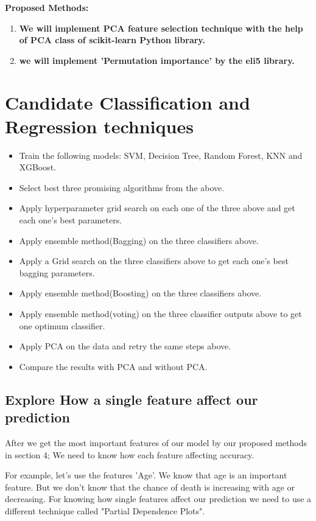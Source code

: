 \documentclass[5 pt]{article}
\begin{document}
\textbf{Proposed Methods:}\\
\begin{enumerate}

\item \textbf{We will implement PCA feature selection technique with the help of PCA class of scikit-learn Python library.}


\item \textbf{we will implement 'Permutation importance' by the eli5 library.}
\end{enumerate}



\newpage

\section{Candidate Classification and Regression techniques}

\begin{itemize}
\item Train the following models: SVM, Decision Tree, Random Forest, KNN and XGBoost.
\item Select best three promising algorithms from the above.
\item Apply hyperparameter grid search on each one of the three above and get each one's best parameters.
\item Apply ensemble method(Bagging) on the three classifiers above.
\item Apply a Grid search on the three classifiers above to get each one's best bagging parameters.
\item Apply ensemble method(Boosting) on the three classifiers above.
\item Apply ensemble method(voting) on the three classifier outputs above to get one optimum classifier.
\item Apply PCA on the data and retry the same steps above.
\item Compare the results with PCA and without PCA.
\end{itemize}

\subsection{Explore How a single feature affect our prediction}
After we get the most important features of our model by our proposed methods in section 4;  We need to know how each feature affecting accuracy.

For example, let's use the features 'Age'. We know that age is an important feature. But we don't know that the chance of death is increasing with age or decreasing. For knowing how single features affect our prediction we need to use a different technique called "Partial Dependence Plots".
\end{document}
